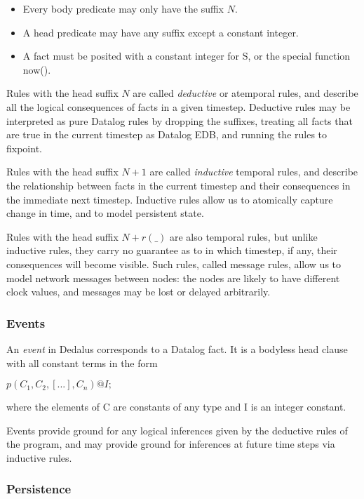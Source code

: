 \begin{itemize}
\item Every body predicate may only have the suffix $N$.
\item A head predicate may have any suffix except a constant integer.
\item A fact must be posited with a constant integer for S, or the special function now().
\end{itemize}
Rules with the head suffix $N$ are called \emph{deductive} or atemporal rules, and describe all the logical consequences of facts in a given 
timestep. Deductive rules may be interpreted as pure Datalog rules by dropping the suffixes, treating all facts that are true in the current 
timestep as Datalog EDB, and running the rules to fixpoint.

Rules with the head suffix $N + 1$ are called \emph{inductive} temporal rules, and describe the relationship between facts in the current timestep 
and their consequences in the immediate next timestep. Inductive rules allow us to atomically capture change in time, and to model persistent state.

Rules with the head suffix $N+r(\_)$ are also temporal rules, but unlike inductive rules, they carry no guarantee as to in which timestep, if any, 
their consequences will become visible. Such rules, called message rules, allow us to model network messages between nodes: the nodes 
are likely to have different clock values, and messages may be lost or delayed arbitrarily.


\subsubsection{Events}

An \emph{event} in Dedalus corresponds to a Datalog fact.  It is a bodyless head clause with all constant terms in the form


$p(C_{1},C_{2},[...],C_{n})@I;$


where the elements of C are constants of any type and I is an integer constant.

Events provide ground for any logical inferences given by the deductive rules of the program, and may provide ground for inferences at 
future time steps via inductive rules.



\subsubsection{Persistence}

